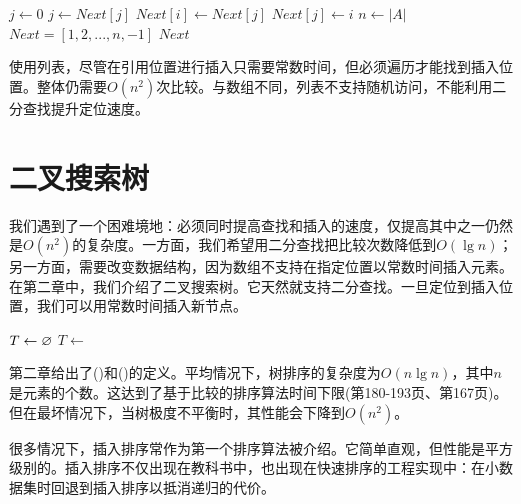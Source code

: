 \documentclass[b5paper]{ctexart}
\begin{document}
\begin{algorithmic}[1]
  \State $j \gets 0$ 
    \State $j \gets Next[j]$
  \EndWhile
  \State $Next[i] \gets Next[j]$
  \State $Next[j] \gets i$
\EndFunction
\Statex
{}
  \State $n \gets |A|$
  \State $Next = [1, 2, ..., n, -1]$ 
    \State {}
  \EndFor
  \State \Return $Next$
\EndFunction
\end{algorithmic}

使用列表，尽管在引用位置进行插入只需要常数时间，但必须遍历才能找到插入位置。整体仍需要$O(n^2)$次比较。与数组不同，列表不支持随机访问，不能利用二分查找提升定位速度。

\begin{Exercise}
\end{Exercise}

\section{二叉搜索树}

我们遇到了一个困难境地：必须同时提高查找和插入的速度，仅提高其中之一仍然是$O(n^2)$的复杂度。一方面，我们希望用二分查找把比较次数降低到$O(\lg n)$；另一方面，需要改变数据结构，因为数组不支持在指定位置以常数时间插入元素。在第二章中，我们介绍了二叉搜索树。它天然就支持二分查找。一旦定位到插入位置，我们可以用常数时间插入新节点。

\begin{algorithmic}[1]
  \State $T \gets \varnothing$
    \State $T \gets $ 
  \EndFor
  \State \Return {}
\EndFunction
\end{algorithmic}

第二章给出了()和()的定义。平均情况下，树排序的复杂度为$O(n \lg n)$，其中$n$是元素的个数。这达到了基于比较的排序算法时间下限(\cite{Knuth-V3}第180-193页、\cite{CLRS}第167页)。但在最坏情况下，当树极度不平衡时，其性能会下降到$O(n^2)$。

很多情况下，插入排序常作为第一个排序算法被介绍。它简单直观，但性能是平方级别的。插入排序不仅出现在教科书中，也出现在快速排序的工程实现中：在小数据集时回退到插入排序以抵消递归的代价。

\ifx\wholebook\relax \else
\end{document}
